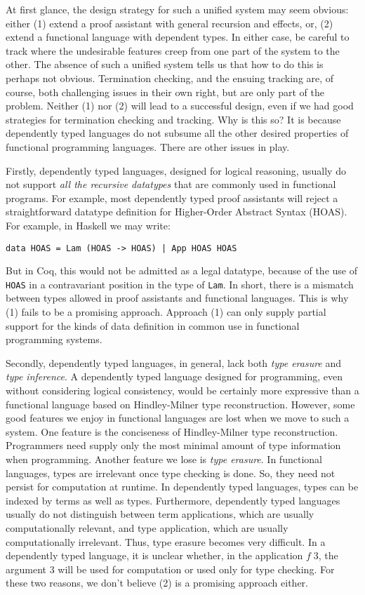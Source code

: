 At first glance, the design strategy for such a unified system may seem obvious:
either
(1) extend a proof assistant with general recursion and effects, or,
(2) extend a functional language with dependent types.
In either case, be careful to track where the undesirable features creep
from one part of the system to the other.
The absence of such a unified system tells us that how to do this is perhaps not obvious.
Termination checking, and the ensuing tracking are, of course, both challenging issues
in their own right, but are only part of the problem. Neither (1) nor (2) will
lead to a successful design, even if we had good strategies for
termination checking and tracking. Why is this so?
It is because dependently typed languages do not subsume
all the other desired properties of functional programming languages. There
are other issues in play.



Firstly, dependently typed languages, designed for logical reasoning, usually do
not support \emph{all the recursive datatypes} that are commonly used in functional programs.
For example, most dependently typed proof assistants will reject
a straightforward datatype definition for Higher-Order Abstract Syntax (HOAS). 
For example, in Haskell we may write:
{\small\begin{verbatim}
data HOAS = Lam (HOAS -> HOAS) | App HOAS HOAS
\end{verbatim}}
But in Coq, this would not be admitted as a legal datatype, because of the
use of {\tt HOAS} in a contravariant position in the type of {\tt Lam}.
In short, there is a mismatch between types allowed in proof assistants and
functional languages. This is why (1) fails to be
a promising approach. Approach (1) can only supply partial support for the kinds
of data definition in common use in functional programming systems.

Secondly, dependently typed languages, in general, lack both \emph{type erasure} and
\emph{type inference}. A dependently typed language designed for programming, even
without considering logical consistency, would be certainly more expressive than a
functional language based on Hindley-Milner type reconstruction. However, some good
features we enjoy in functional languages are lost when we move to such a system. One
feature is the conciseness of Hindley-Milner type reconstruction. Programmers need
supply only the most minimal amount of type information when programming. Another
feature we lose is \emph{type erasure}. In functional languages, types are irrelevant
once type checking is done. So, they need not persist for computation at runtime. In
dependently typed languages, types can be indexed by terms as well as types.
Furthermore, dependently typed languages usually do not distinguish between term
applications, which are usually computationally relevant, and type application, which
are usually computationally irrelevant. Thus, type erasure becomes very difficult. In a
dependently typed language, it is unclear whether, in the application $f\;3$, the
argument $3$ will be used for computation or used only for type checking.
For these two reasons, we don't believe (2) is a promising approach either.

